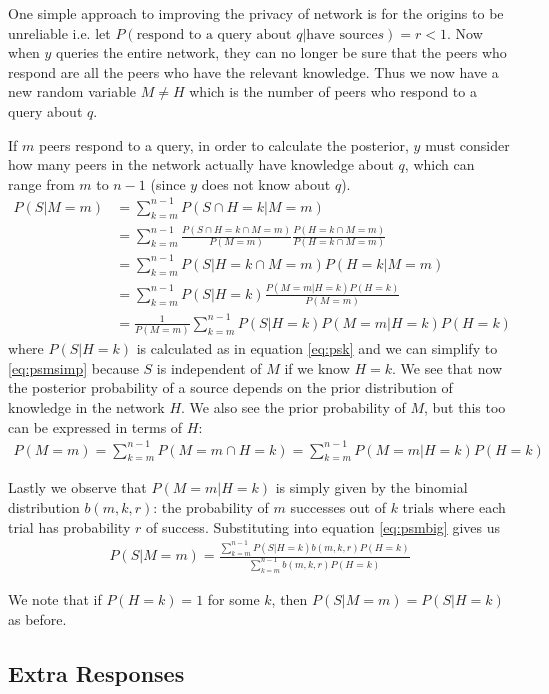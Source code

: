 \documentclass{article}
\newcommand{\eqnref}[1]{equation \eqref{eq:#1}}
\begin{document}
One simple approach to improving the privacy of network is for the origins to be
unreliable i.e. let $P(\text{respond to a query about }q|\text{have source
}s)=r<1$. Now when $y$ queries the entire network, they can no longer be sure
that the peers who respond are all the peers who have the relevant knowledge.
Thus we now have a new random variable $M\ne H$ which is the number of peers who
respond to a query about $q$.

If $m$ peers respond to a query, in order to calculate the posterior, $y$ must
consider how many peers in the network actually have knowledge about $q$, which
can range from $m$ to $n-1$ (since $y$ does not know about $q$).
\begin{align}
	P(S|M=m)&=\sum_{k=m}^{n-1}P(S\cap H=k|M=m)\nonumber\\
	&=\sum_{k=m}^{n-1}\frac{P(S\cap H=k\cap M=m)}{P(M=m)}\frac{P(H=k\cap
	M=m)}{P(H=k\cap M=m)}\nonumber\\
	&=\sum_{k=m}^{n-1}P(S|H=k\cap M=m)P(H=k|M=m)\nonumber\\
	&=\sum_{k=m}^{n-1}P(S|H=k)\frac{P(M=m|H=k)P(H=k)}{P(M=m)}\label{eq:psmsimp}\\
	&=\frac{1}{P(M=m)}\sum_{k=m}^{n-1}P(S|H=k)P(M=m|H=k)P(H=k)\label{eq:psmbig}
\end{align}
where $P(S|H=k)$ is calculated as in \eqnref{psk} and we can simplify to
\eqref{eq:psmsimp} because $S$ is independent of $M$ if we know $H=k$.
We see that now the posterior probability of a source depends on the prior
distribution of knowledge in the network $H$. We also see the prior probability
of $M$, but this too can be expressed in terms of $H$:
\begin{align*}
	P(M=m)=\sum_{k=m}^{n-1}P(M=m\cap H=k)=\sum_{k=m}^{n-1}P(M=m|H=k)P(H=k)
\end{align*}

Lastly we observe that $P(M=m|H=k)$ is simply given by the binomial
distribution $b(m,k,r)$: the probability of $m$ successes out of $k$ trials where
each trial has probability $r$ of success. Substituting into \eqnref{psmbig} gives us
\begin{align*}
	P(S|M=m)=\frac{\sum_{k=m}^{n-1}P(S|H=k)b(m,k,r)P(H=k)}{\sum_{k=m}^{n-1}b(m,k,r)P(H=k)}
\end{align*}

We note that if $P(H=k)=1$ for some $k$, then $P(S|M=m)=P(S|H=k)$ as before.

\subsection{Extra Responses}
\end{document}
